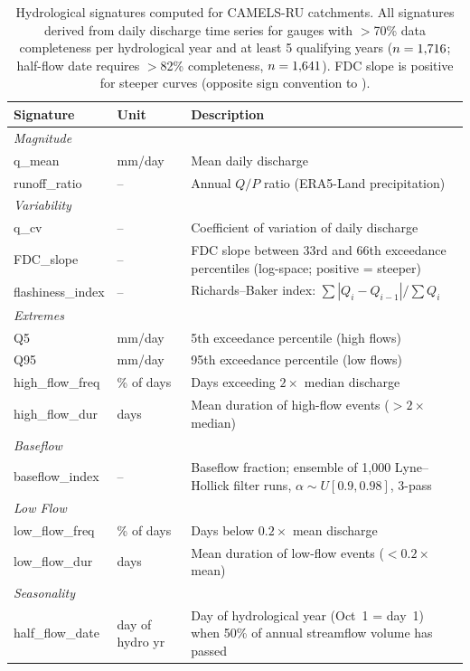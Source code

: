 \begin{table}[htbp]
\centering
\caption{Hydrological signatures computed for CAMELS-RU catchments. All signatures derived from daily discharge time series for gauges with $>$70\% data completeness per hydrological year and at least 5 qualifying years ($n = 1{,}716$; half-flow date requires $>$82\% completeness, $n = 1{,}641$). FDC slope is positive for steeper curves (opposite sign convention to \citealt{Sawicz2011}).}
\label{tab:hydro_signatures}
\begin{tabular}{llp{5.5cm}}
\toprule
\textbf{Signature} & \textbf{Unit} & \textbf{Description} \\
\midrule
\multicolumn{3}{l}{\textit{Magnitude}} \\
\quad q\_mean & mm/day & Mean daily discharge \\
\quad runoff\_ratio & -- & Annual $Q/P$ ratio (ERA5-Land precipitation) \\
\midrule
\multicolumn{3}{l}{\textit{Variability}} \\
\quad q\_cv & -- & Coefficient of variation of daily discharge \\
\quad FDC\_slope & -- & FDC slope between 33rd and 66th exceedance percentiles (log-space; positive = steeper) \\
\quad flashiness\_index & -- & Richards--Baker index: $\sum|Q_{i}-Q_{i-1}|/\sum Q_i$ \\
\midrule
\multicolumn{3}{l}{\textit{Extremes}} \\
\quad Q5 & mm/day & 5th exceedance percentile (high flows) \\
\quad Q95 & mm/day & 95th exceedance percentile (low flows) \\
\quad high\_flow\_freq & \% of days & Days exceeding $2\times$ median discharge \\
\quad high\_flow\_dur & days & Mean duration of high-flow events ($>2\times$ median) \\
\midrule
\multicolumn{3}{l}{\textit{Baseflow}} \\
\quad baseflow\_index & -- & Baseflow fraction; ensemble of 1{,}000 Lyne--Hollick filter runs, $\alpha \sim U[0.9, 0.98]$, 3-pass \\
\midrule
\multicolumn{3}{l}{\textit{Low Flow}} \\
\quad low\_flow\_freq & \% of days & Days below $0.2\times$ mean discharge \\
\quad low\_flow\_dur & days & Mean duration of low-flow events ($<0.2\times$ mean) \\
\midrule
\multicolumn{3}{l}{\textit{Seasonality}} \\
\quad half\_flow\_date & day of hydro yr & Day of hydrological year (Oct~1 = day~1) when 50\% of annual streamflow volume has passed \\
\bottomrule
\end{tabular}
\end{table}
